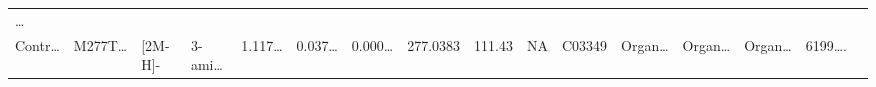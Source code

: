 \documentclass[
]{article}
\begin{document}
\begin{longtable}[]{@{}llllllllllllllll@{}}
\begin{minipage}[t]{0.02\columnwidth}
\ldots{}\strut
\end{minipage}\tabularnewline
\begin{minipage}[t]{0.04\columnwidth}\raggedright
Contr\ldots{}\strut
\end{minipage} & \begin{minipage}[t]{0.04\columnwidth}\raggedright
M277T\ldots{}\strut
\end{minipage} & \begin{minipage}[t]{0.04\columnwidth}\raggedright
{[}2M-H{]}-\strut
\end{minipage} & \begin{minipage}[t]{0.04\columnwidth}\raggedright
3-ami\ldots{}\strut
\end{minipage} & \begin{minipage}[t]{0.04\columnwidth}\raggedright
1.117\ldots{}\strut
\end{minipage} & \begin{minipage}[t]{0.04\columnwidth}\raggedright
0.037\ldots{}\strut
\end{minipage} & \begin{minipage}[t]{0.04\columnwidth}\raggedright
0.000\ldots{}\strut
\end{minipage} & \begin{minipage}[t]{0.04\columnwidth}\raggedright
277.0383\strut
\end{minipage} & \begin{minipage}[t]{0.04\columnwidth}\raggedright
111.43\strut
\end{minipage} & \begin{minipage}[t]{0.04\columnwidth}\raggedright
NA\strut
\end{minipage} & \begin{minipage}[t]{0.03\columnwidth}\raggedright
C03349\strut
\end{minipage} & \begin{minipage}[t]{0.04\columnwidth}\raggedright
Organ\ldots{}\strut
\end{minipage} & \begin{minipage}[t]{0.04\columnwidth}\raggedright
Organ\ldots{}\strut
\end{minipage} & \begin{minipage}[t]{0.04\columnwidth}\raggedright
Organ\ldots{}\strut
\end{minipage} & \begin{minipage}[t]{0.04\columnwidth}\raggedright
6199\ldots.\strut
\end{minipage} & \begin{minipage}[t]{0.02\columnwidth}\raggedright

\end{minipage}
\end{longtable}
\end{document}
